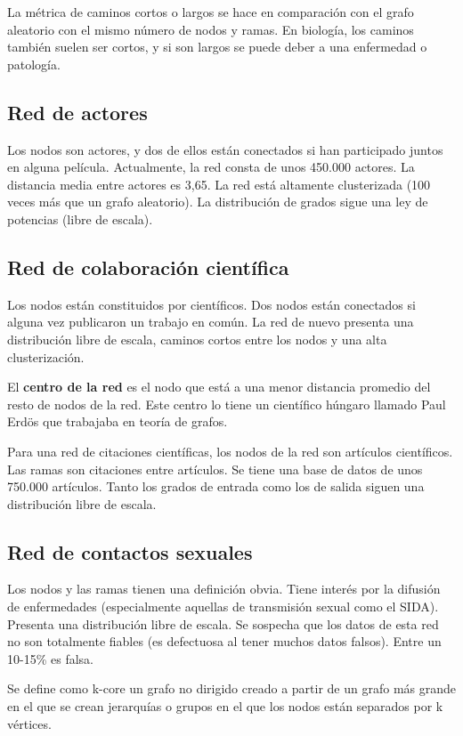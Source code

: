 La métrica de caminos cortos o largos se hace en comparación con el grafo aleatorio con el mismo número de nodos y ramas. En biología, los caminos también suelen ser cortos, y si son largos se puede deber a una enfermedad o patología.

\subsection{Red de actores}
Los nodos son actores, y dos de ellos están conectados si han participado juntos en alguna película. Actualmente, la red consta de unos 450.000 actores.
La distancia media entre actores es 3,65. La red está altamente clusterizada (100 veces más que un grafo aleatorio). La distribución de grados sigue una ley de potencias (libre de escala).

\subsection{Red de colaboración científica}
Los nodos están constituidos por científicos. Dos nodos están conectados si alguna vez publicaron un trabajo en común. La red de nuevo presenta una distribución libre de escala, caminos cortos entre los nodos y una alta clusterización. 

El \textbf{centro de la red} es el nodo que está a una menor distancia promedio del resto de nodos de la red. Este centro lo tiene un científico húngaro llamado Paul Erdös que trabajaba en teoría de grafos. 

Para una red de citaciones científicas, los nodos de la red son artículos científicos. Las ramas son citaciones entre artículos. Se tiene una base de datos de unos 750.000 artículos. Tanto los grados de entrada como los de salida siguen una distribución libre de escala.

\subsection{Red de contactos sexuales}
Los nodos y las ramas tienen una definición obvia. Tiene interés por la difusión de enfermedades (especialmente aquellas de transmisión sexual como el SIDA). Presenta una distribución libre de escala. Se sospecha que los datos de esta red no son totalmente fiables (es defectuosa al tener muchos datos falsos). Entre un 10-15\% es falsa.

Se define como k-core un grafo no dirigido creado a partir de un grafo más grande en el que se crean jerarquías o grupos en el que los nodos están separados por k vértices.


